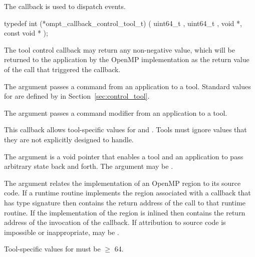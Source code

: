 \begin{itemize}
\begin{itemize}
\label{sec:ompt_callback_control_tool_t}
\summary
The  callback is used to dispatch
 events.

\format

\begin{ccppspecific}
\begin{omptCallback}
typedef int (*ompt_callback_control_tool_t) (
  uint64_t ,
  uint64_t ,
  void *,
  const void *
);
\end{omptCallback}
\end{ccppspecific}


\descr

The tool control callback may return any non-negative value, which will be returned to the
application by the OpenMP implementation as the return value of the
 call that triggered the callback.

\argdesc

The argument  passes a command from an application
to a tool.  Standard values for  are defined by
 in Section~\ref{sec:control_tool}.

The argument  passes a command modifier from an
application to a tool.

This callback allows tool-specific values for  and
.  Tools must ignore  values that they are
not explicitly designed to handle.

The argument  is a void pointer that enables a tool and
an application to pass arbitrary state back and forth.
The argument  may be .

The  argument relates the implementation of an OpenMP region
to its source code. If a runtime routine implements the region associated with
a callback that has type signature  then
 contains the return address of the call to that runtime routine.
If the implementation of the region is inlined then  contains the
return address of the invocation of the callback. If attribution to source code
is impossible or inappropriate, may be .

\constraints
Tool-specific values for  must be $\geq$ 64.


\end{itemize}
\end{itemize}
